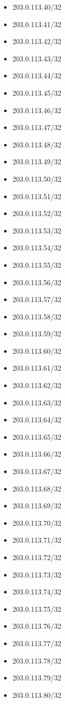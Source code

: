 \documentclass[a4paper,10pt]{article}
\begin{document}
\begin{itemize}
  \item 203.0.113.40/32
  \item 203.0.113.41/32
  \item 203.0.113.42/32
  \item 203.0.113.43/32
  \item 203.0.113.44/32
  \item 203.0.113.45/32
  \item 203.0.113.46/32
  \item 203.0.113.47/32
  \item 203.0.113.48/32
  \item 203.0.113.49/32
  \item 203.0.113.50/32
  \item 203.0.113.51/32
  \item 203.0.113.52/32
  \item 203.0.113.53/32
  \item 203.0.113.54/32
  \item 203.0.113.55/32
  \item 203.0.113.56/32
  \item 203.0.113.57/32
  \item 203.0.113.58/32
  \item 203.0.113.59/32
  \item 203.0.113.60/32
  \item 203.0.113.61/32
  \item 203.0.113.62/32
  \item 203.0.113.63/32
  \item 203.0.113.64/32
  \item 203.0.113.65/32
  \item 203.0.113.66/32
  \item 203.0.113.67/32
  \item 203.0.113.68/32
  \item 203.0.113.69/32
  \item 203.0.113.70/32
  \item 203.0.113.71/32
  \item 203.0.113.72/32
  \item 203.0.113.73/32
  \item 203.0.113.74/32
  \item 203.0.113.75/32
  \item 203.0.113.76/32
  \item 203.0.113.77/32
  \item 203.0.113.78/32
  \item 203.0.113.79/32
  \item 203.0.113.80/32

\end{itemize}
\end{document}
